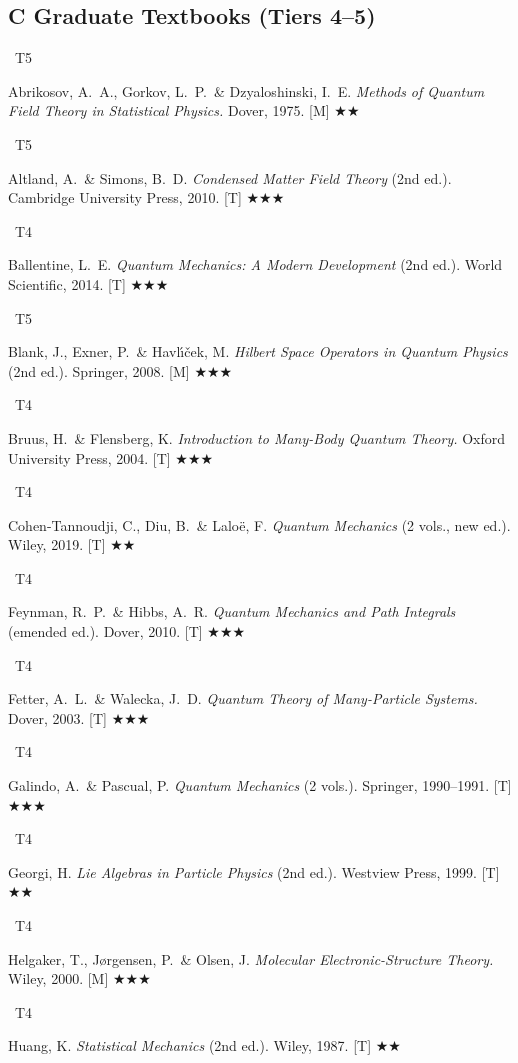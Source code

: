 \documentclass[11pt,a4paper]{article}
\newcommand{\tierbadge}[2]{\colorbox{#1}{\small\bfseries\color{white}\strut\ #2\ }}
\newcommand{\essential}{$\bigstar\bigstar\bigstar$}
\newcommand{\recommended}{$\bigstar\bigstar$}
\begin{document}
\subsection*{C \quad Graduate Textbooks (Tiers 4--5)}
\begin{tcolorbox}[catbox]
\begin{enumerate}[leftmargin=2.5em,label=\textbf{[C\arabic*]},itemsep=3pt]
  \item \tierbadge{t5red}{T5} Abrikosov, A.~A., Gorkov, L.~P.\ \& Dzyaloshinski, I.~E. \textit{Methods of Quantum Field Theory in Statistical Physics.} Dover, 1975. [M] \recommended
  \item \tierbadge{t5red}{T5} Altland, A.\ \& Simons, B.~D. \textit{Condensed Matter Field Theory} (2nd ed.). Cambridge University Press, 2010. [T] \essential
  \item \tierbadge{t4orange}{T4} Ballentine, L.~E. \textit{Quantum Mechanics: A Modern Development} (2nd ed.). World Scientific, 2014. [T] \essential
  \item \tierbadge{t5red}{T5} Blank, J., Exner, P.\ \& Havl\'{\i}\v{c}ek, M. \textit{Hilbert Space Operators in Quantum Physics} (2nd ed.). Springer, 2008. [M] \essential
  \item \tierbadge{t4orange}{T4} Bruus, H.\ \& Flensberg, K. \textit{Introduction to Many-Body Quantum Theory.} Oxford University Press, 2004. [T] \essential
  \item \tierbadge{t4orange}{T4} Cohen-Tannoudji, C., Diu, B.\ \& Lalo\"e, F. \textit{Quantum Mechanics} (2 vols., new ed.). Wiley, 2019. [T] \recommended
  \item \tierbadge{t4orange}{T4} Feynman, R.~P.\ \& Hibbs, A.~R. \textit{Quantum Mechanics and Path Integrals} (emended ed.). Dover, 2010. [T] \essential
  \item \tierbadge{t4orange}{T4} Fetter, A.~L.\ \& Walecka, J.~D. \textit{Quantum Theory of Many-Particle Systems.} Dover, 2003. [T] \essential
  \item \tierbadge{t4orange}{T4} Galindo, A.\ \& Pascual, P. \textit{Quantum Mechanics} (2 vols.). Springer, 1990--1991. [T] \essential
  \item \tierbadge{t4orange}{T4} Georgi, H. \textit{Lie Algebras in Particle Physics} (2nd ed.). Westview Press, 1999. [T] \recommended
  \item \tierbadge{t4orange}{T4} Helgaker, T., J\o rgensen, P.\ \& Olsen, J. \textit{Molecular Electronic-Structure Theory.} Wiley, 2000. [M] \essential
  \item \tierbadge{t4orange}{T4} Huang, K. \textit{Statistical Mechanics} (2nd ed.). Wiley, 1987. [T] \recommended

\end{enumerate}
\end{tcolorbox}
\end{document}
